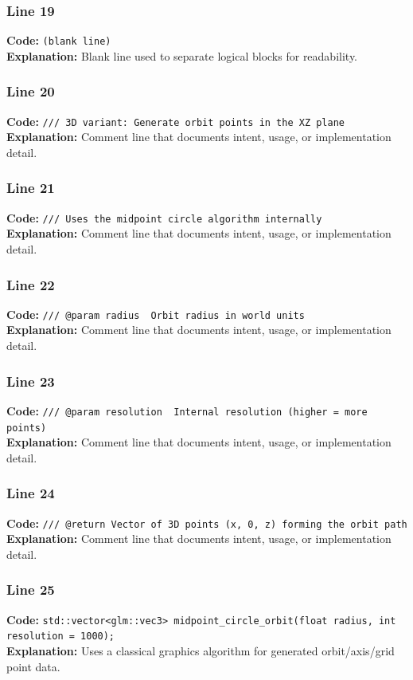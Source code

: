 \documentclass[11pt,a4paper]{article}
\begin{document}
\subsubsection*{Line 19}
\textbf{Code:} \texttt{(blank line)}\\
\textbf{Explanation:} Blank line used to separate logical blocks for readability.

\subsubsection*{Line 20}
\textbf{Code:} \verb|/// 3D variant: Generate orbit points in the XZ plane|\\
\textbf{Explanation:} Comment line that documents intent, usage, or implementation detail.

\subsubsection*{Line 21}
\textbf{Code:} \verb|/// Uses the midpoint circle algorithm internally|\\
\textbf{Explanation:} Comment line that documents intent, usage, or implementation detail.

\subsubsection*{Line 22}
\textbf{Code:} \verb|/// @param radius  Orbit radius in world units|\\
\textbf{Explanation:} Comment line that documents intent, usage, or implementation detail.

\subsubsection*{Line 23}
\textbf{Code:} \verb|/// @param resolution  Internal resolution (higher = more points)|\\
\textbf{Explanation:} Comment line that documents intent, usage, or implementation detail.

\subsubsection*{Line 24}
\textbf{Code:} \verb|/// @return Vector of 3D points (x, 0, z) forming the orbit path|\\
\textbf{Explanation:} Comment line that documents intent, usage, or implementation detail.

\subsubsection*{Line 25}
\textbf{Code:} \verb|std::vector<glm::vec3> midpoint_circle_orbit(float radius, int resolution = 1000);|\\
\textbf{Explanation:} Uses a classical graphics algorithm for generated orbit/axis/grid point data.
\end{document}
